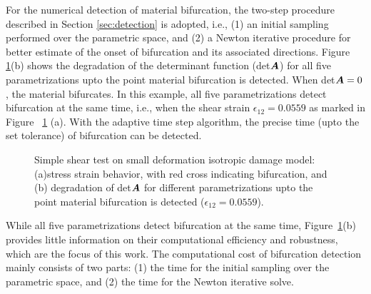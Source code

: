\documentclass[12pt]{article}
\numberwithin{equation}{section}
\begin{document}
For the numerical detection of material bifurcation, the two-step 
procedure described in Section \ref{sec:detection} is adopted, i.e., 
(1) an initial sampling performed over the parametric space, and (2) a 
Newton iterative procedure for better estimate of the onset of  
bifurcation and its associated directions. Figure~
\ref{fig:iso_stress_strain}(b) shows the degradation of the 
determinant function (det${\boldsymbol{A}}$) for all five parametrizations upto the 
point material bifurcation is detected. When det${\boldsymbol{A}} = 0$, the 
material bifurcates. In this example, all five parametrizations detect 
bifurcation at the same time, i.e., when the shear strain 
$\epsilon_{12}=0.0559$ as marked in Figure~
\ref{fig:iso_stress_strain} (a). With the adaptive time step 
algorithm, the precise time (upto the set tolerance) of bifurcation 
can be detected.

\begin{figure}[H]
  \centering {} 
  \caption{Simple shear test on small deformation 
  isotropic damage model: 
  (a)stress strain behavior, with red cross indicating bifurcation, and
  (b) degradation of det${\boldsymbol{A}}$ for different
  parametrizations upto the point material bifurcation is detected ($\epsilon_{12}=0.0559$).}
  \label{fig:iso_stress_strain}
\end{figure}

While all five parametrizations detect bifurcation at the same time, 
Figure~\ref{fig:iso_stress_strain}(b) provides little information on 
their computational efficiency and robustness, which are the focus of 
this work. The computational cost of bifurcation detection mainly 
consists of two parts: (1) the time for the initial sampling over the 
parametric space, and (2) the time for the Newton iterative solve. 
\end{document}
